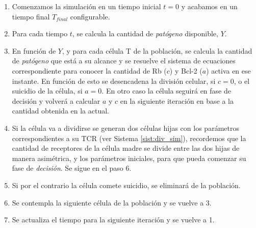 \begin{enumerate}
	\item Comenzamos la simulación en un tiempo inicial $t=0$ y acabamos en un tiempo final $T_{final}$ configurable.
	
	\item Para cada tiempo $t$, se calcula la cantidad de \textit{patógeno} disponible, $Y$. 
	
	\item En función de $Y$, y para cada célula T de la población, se calcula la cantidad de \textit{patógeno} que está a su alcance y se resuelve el sistema de ecuaciones correspondiente para conocer la cantidad de Rb ($c$) y Bcl-2 ($a$) activa en ese instante. En función de esto se desencadena la división celular, si $c = 0$, o el suicidio de la célula, si $a = 0$. En otro caso la célula seguirá en fase de decisión y volverá a calcular $a$ y $c$ en la siguiente iteración en base a la cantidad obtenida en la actual.
	
	\item Si la célula va a dividirse se generan dos células hijas con los parámetros correspondientes a su TCR (ver Sistema  \ref{sist:div_sim}), recordemos que la cantidad de receptores de la célula madre se divide entre las dos hijas de manera asimétrica, y los parámetros iniciales, para que pueda comenzar su fase de \textit{decisión}. Se sigue en el paso 6.
	
	\item Si por el contrario la célula comete suicidio, se eliminará de la población. 

	\item Se contempla la siguiente célula de la población y se vuelve a 3.
	
	\item Se actualiza el tiempo para la siguiente iteración y se vuelve a 1.
\end{enumerate}


